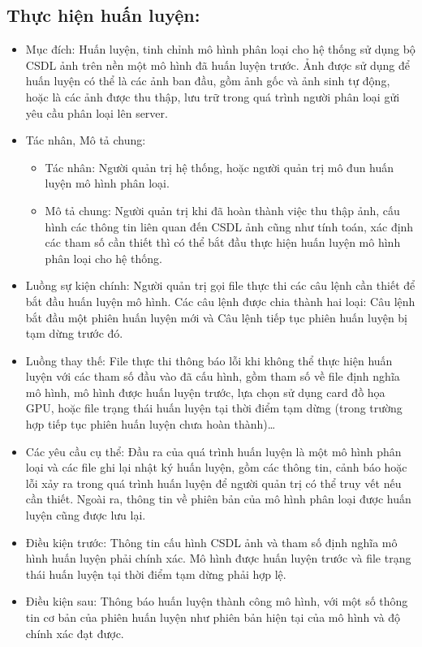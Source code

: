 \subsection{Thực hiện huấn luyện:}
\begin{itemize}
	\item Mục đích: Huấn luyện, tinh chỉnh mô hình phân loại cho hệ thống sử dụng bộ CSDL ảnh trên nền một mô hình đã huấn luyện trước. Ảnh được sử dụng để huấn luyện có thể là các ảnh ban đầu, gồm ảnh gốc và ảnh sinh tự động, hoặc là các ảnh được thu thập, lưu trữ trong quá trình người phân loại gửi yêu cầu phân loại lên server.
	\item Tác nhân, Mô tả chung:
	\begin{itemize}
		\item Tác nhân: Người quản trị hệ thống, hoặc người quản trị mô đun huấn luyện mô hình phân loại.
		\item Mô tả chung: Người quản trị khi đã hoàn thành việc thu thập ảnh, cấu hình các thông tin liên quan đến CSDL ảnh cũng như tính toán, xác định các tham số cần thiết thì có thể bắt đầu thực hiện huấn luyện mô hình phân loại cho hệ thống.
	\end{itemize}
	\item Luồng sự kiện chính: Người quản trị gọi file thực thi các câu lệnh cần thiết để bắt đầu huấn luyện mô hình. Các câu lệnh được chia thành hai loại: Câu lệnh	bắt đầu một phiên huấn luyện mới và Câu lệnh tiếp tục phiên huấn luyện bị tạm dừng trước đó.
	\item Luồng thay thế: File thực thi thông báo lỗi khi không thể thực hiện huấn luyện với các tham số đầu vào đã cấu hình, gồm tham số về file định nghĩa mô hình, mô hình được huấn luyện trước, lựa chọn sử dụng card đồ họa GPU, hoặc file trạng thái huấn luyện tại thời điểm tạm dừng (trong trường hợp tiếp tục phiên huấn luyện chưa hoàn thành)…
	\item Các yêu cầu cụ thể: Đầu ra của quá trình huấn luyện là một mô hình phân loại và các file ghi lại nhật ký huấn luyện, gồm các thông tin, cảnh báo hoặc lỗi xảy ra trong quá trình huấn luyện để người quản trị có thể truy vết nếu cần thiết. Ngoài ra, thông tin về phiên bản của mô hình phân loại được huấn luyện cũng được lưu lại.
	\item Điều kiện trước: Thông tin cấu hình CSDL ảnh và tham số định nghĩa mô	hình huấn luyện phải chính xác. Mô hình được huấn luyện trước và file trạng thái huấn luyện tại thời điểm tạm dừng phải hợp lệ.
	\item Điều kiện sau: Thông báo huấn luyện thành công mô hình, với một số thông tin cơ bản của phiên huấn luyện như phiên bản hiện tại của mô hình và độ	chính xác đạt được.
\end{itemize}

